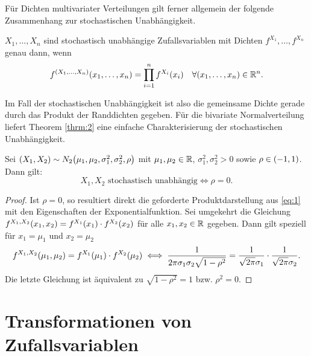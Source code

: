 \documentclass{lecture}
\begin{document}
    Für Dichten multivariater Verteilungen gilt ferner allgemein der folgende Zusammenhang zur stochastischen Unabhängigkeit.

    \begin{theorem}\label{thrm:2}
        \(X_1, \ldots, X_n\) sind stochastisch unabhängige Zufallsvariablen mit Dichten \(f^{X_1}, \ldots, f^{X_n}\) genau dann, wenn
        \[
            f^{\parentheses*{X_1, \ldots, X_n}}\parentheses*{x_1, \ldots, x_n} = \prod_{i = 1}^n f^{X_i}\parentheses*{x_i} \quad \forall\parentheses*{x_1, \ldots, x_n} \in \R^n.
        \]
    \end{theorem}

    Im Fall der stochastischen Unabhängigkeit ist also die gemeinsame Dichte gerade durch das Produkt der Randdichten gegeben.
    Für die bivariate Normalverteilung liefert Theorem \ref{thrm:2} eine einfache Charakterisierung der stochastischen Unabhängigkeit.

    \begin{theorem}
        Sei \(\parentheses*{X_1, X_2} \sim N_2\parentheses*{\mu_1, \mu_2, \sigma_1^2, \sigma_2^2, \rho}\) mit \(\mu_1, \mu_2 \in \R\), \(\sigma_1^2, \sigma_2^2 > 0\) sowie \(\rho \in \parentheses*{-1, 1}\).
        Dann gilt:
        \[
            X_1, X_2\text{ stochastisch unabhängig} \iff \rho = 0.
        \]
    \end{theorem}

    \begin{proof}
        Ist \(\rho = 0\), so resultiert direkt die geforderte Produktdarstellung aus \eqref{eq:1} mit den Eigenschaften der Exponentialfunktion.
        Sei umgekehrt die Gleichung \(f^{X_1, X_2}\parentheses*{x_1, x_2} = f^{X_1}\parentheses*{x_1} \cdot f^{X_2}\parentheses*{x_2}\) für alle \(x_1, x_2 \in \R\) gegeben.
        Dann gilt speziell für \(x_1 = \mu_1\) und \(x_2 = \mu_2\)
        \[
            f^{X_1, X_2}\parentheses*{\mu_1, \mu_2} = f^{X_1}\parentheses*{\mu_1} \cdot f^{X_2}\parentheses*{\mu_2} \iff \frac{1}{2\pi\sigma_1 \sigma_2 \sqrt{1 - \rho^2}} = \frac{1}{\sqrt{2\pi}\sigma_1} \cdot \frac{1}{\sqrt{2\pi}\sigma_2}.
        \]
        Die letzte Gleichung ist äquivalent zu \(\sqrt{1 - \rho^2} = 1\) bzw. \(\rho^2 = 0\).
    \end{proof}


    \section*{Transformationen von Zufallsvariablen}
\end{document}
